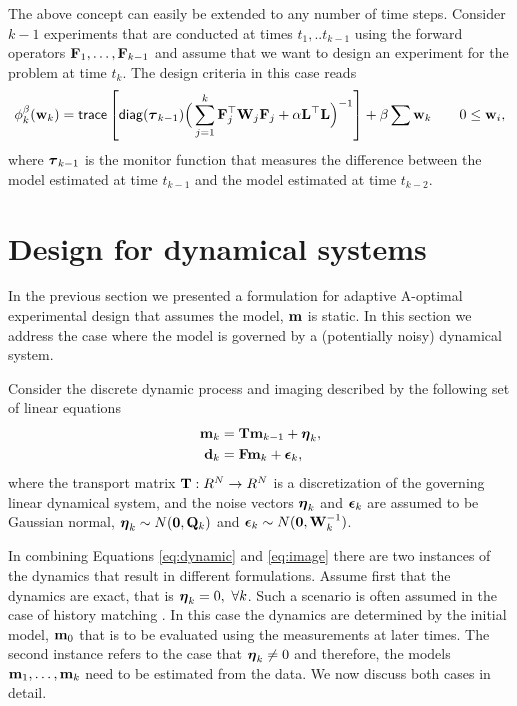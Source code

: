 \documentclass[final,leqno,onefignum,onetabnum]{siamltexmm}
\begin{document}
The above concept can  easily be extended to any number of time steps.
Consider $k-1$ experiments that are conducted at times $t_1,..t_{k-1}$ using
the forward operators ${\bf{F}}_{1},\ldots,{\bf{F}}_{k-1}$ and assume that we want to design an experiment 
for the problem at time $t_{k}$. The design criteria in this case reads
%
\begin{align}
\label{amsek}
\phi_{k}^{\beta}(\bfw_{k}) =  {\sf trace} \left[  {\sf diag}(\bftau_{k-1}) \Big(\sum_{j=1}^{k}\bfF_{j}^{\top}\bfW_{j}\bfF_{j}   +
\alpha \LtL\Big)^{-1} \right] + \beta \sum \bfw_{k}\quad \quad 0 \le \bfw_i, 
\end{align}
%
where ${\boldsymbol \tau}_{k-1}$ is the monitor function that measures the difference between the model estimated
at time $t_{k-1}$ and the model estimated at time $t_{k-2}$.
%
%
%
\section{Design for dynamical systems}
\label{sec:Dynamic}
In the previous section we presented a formulation for adaptive A-optimal experimental 
design that assumes  the model, ${\bf{m}}$
is static. 
In this section we address the case where the model is governed by a (potentially noisy)
dynamical system.

Consider the discrete  dynamic process and imaging  described  by the following set of linear equations
%
\begin{subequations}
\begin{align}
\label{eq:dynamic}
\bfm _k&= \bfT\bfm_{k-1} + {\bfeta}_k,\\
\label{eq:image}
\bfd_k &= \bfF \bfm_k + {\bfepsilon}_k,
\end{align}  
\end{subequations}
%
where the transport matrix ${\bf{T}}:R^{N} \rightarrow R^{N}$  is
a discretization of the governing linear dynamical  system, and the noise vectors ${\boldsymbol \eta}_k $ and ${\boldsymbol \epsilon}_k $ are assumed to be Gaussian normal, ${\boldsymbol \eta}_k \sim N({\bf 0},{\bf{Q}}_k)$ and ${{\boldsymbol \epsilon}_k} \sim N({\bf 0},{\bf{W}}^{-1}_k)$.

In combining Equations \eqref{eq:dynamic} and \eqref{eq:image}  there are two instances of the 
dynamics that result in different formulations. 
Assume first that the dynamics are exact, that is $\bfeta_{k}=0, \ \forall  k$.
Such a scenario is often assumed in the case of history matching \cite{Oliver2010a}. In this
case the dynamics are determined by the initial model, ${\bf{m}}_{0}$ that is to be evaluated
using the measurements at later times. The second  instance refers to the case that
${\boldsymbol \eta}_{k} \not=0$ and therefore, the models ${\bf{m}}_{1},\ldots,{\bf{m}}_{k}$ need to be estimated
from the data. We now discuss both cases in detail. 
%
\end{document}
